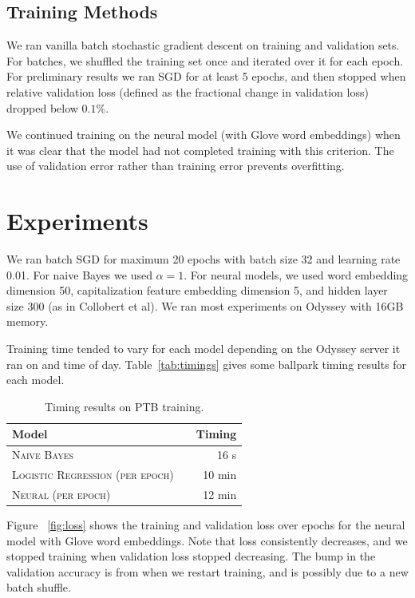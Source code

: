 \documentclass[11pt]{article}
\begin{document}
\subsection{Training Methods}

We ran vanilla batch stochastic gradient descent on training and validation sets. For batches, we shuffled the training set once and iterated over it for each epoch. For preliminary results we ran SGD for at least 5 epochs, and then stopped when relative validation loss (defined as the fractional change in validation loss) dropped below $0.1\%$.

We continued training on the neural model (with Glove word embeddings) when it was clear that the model had not completed training with this criterion. The use of validation error rather than training error prevents overfitting.

\section{Experiments}

We ran batch SGD for maximum 20 epochs with batch size 32 and learning rate 0.01. For naive Bayes we used $\alpha = 1$. For neural models, we used word embedding dimension 50, capitalization feature embedding dimension 5, and hidden layer size 300 (as in Collobert et al). We ran most experiments on Odyssey with 16GB memory.

Training time tended to vary for each model depending on the Odyssey server it ran on and time of day. Table~\ref{tab:timings} gives some ballpark timing results for each model.

\begin{table}[h]
\centering
\begin{tabular}{llr}
 \toprule
 Model &  & Timing \\
 \midrule
 \textsc{Naive Bayes} & & 16 s\\
 \textsc{Logistic Regression (per epoch)} & & 10 min \\
 \textsc{Neural (per epoch)} & &12 min \\
 \bottomrule
\end{tabular}
\caption{\label{tab:timing} Timing results on PTB training.}
\end{table}


Figure ~\ref{fig:loss} shows the training and validation loss over epochs for the neural model with Glove word embeddings. Note that loss consistently decreases, and we stopped training when validation loss stopped decreasing. The bump in the validation accuracy is from when we restart training, and is possibly due to a new batch shuffle.
\end{document}
